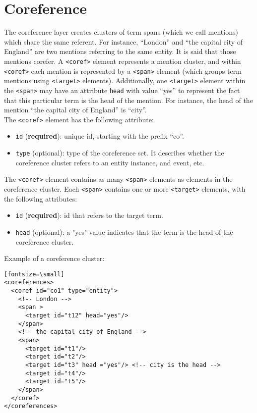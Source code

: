 
\section{Coreference}
\label{sec:coreference}

The coreference layer creates clusters of term spans (which we call
mentions) which share the same referent. For instance, ``London'' and ``the
capital city of England'' are two mentions referring to the same entity. It
is said that those mentions corefer.  A \texttt{<coref>} element represents
a mention cluster, and within \texttt{<coref>} each mention is represented
by a \texttt{<span>} element (which groups term mentions using
\texttt{<target>} elements). Additionally, one \texttt{<target>} element
within the \texttt{<span>} may have an attribute \texttt{head} with value
``yes'' to represent the fact that this particular term is the head of the
mention. For instance, the head of the mention ``the capital city of
England'' is ``city''.\\

The \texttt{<coref>} element has the following attribute:
\begin{itemize}
\item \texttt{id} (\textbf{required}): unique id, starting with the prefix ``co''.
\item \texttt{type} (optional): type of the coreference set. It describes
  whether the coreference cluster refers to an entity instance, and event,
  etc.
\end{itemize}

The \texttt{<coref>} element contains as many \texttt{<span>} elements as
elements in the coreference cluster. Each \texttt{<span>} contains one or
more \texttt{<target>} elements, with the following attributes:
\begin{itemize}
\item \texttt{id} (\textbf{required}): id that refers to the target term.
\item \texttt{head} (optional): a "yes" value indicates that the term is the
  head of the coreference cluster.
\end{itemize}

Example of a coreference cluster:

\begin{verbatim}[fontsize=\small]
<coreferences>
  <coref id="co1" type="entity">
    <!-- London -->
    <span >
      <target id="t12" head="yes"/>
    </span>
    <!-- the capital city of England -->
    <span>
      <target id="t1"/>
      <target id="t2"/>
      <target id="t3" head ="yes"/> <!-- city is the head -->
      <target id="t4"/>
      <target id="t5"/>
    </span>
  </coref>
</coreferences>
\end{verbatim}


